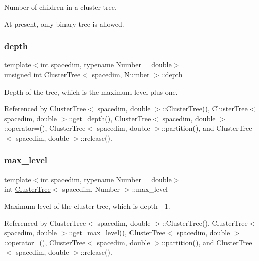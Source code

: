 Number of children in a cluster tree.

At present, only binary tree is allowed. \mbox{\label{classClusterTree_a051df20340ed3f0e4bc0ee1fb1119f9f}} 
\subsubsection{\texorpdfstring{depth}{depth}}
{\footnotesize\ttfamily template$<$int spacedim, typename Number = double$>$ \\
unsigned int \hyperlink{classClusterTree}{Cluster\+Tree}$<$ spacedim, Number $>$\+::depth\hspace{0.3cm}{\ttfamily [private]}}

Depth of the tree, which is the maximum level plus one. 

Referenced by Cluster\+Tree$<$ spacedim, double $>$\+::\+Cluster\+Tree(), Cluster\+Tree$<$ spacedim, double $>$\+::get\+\_\+depth(), Cluster\+Tree$<$ spacedim, double $>$\+::operator=(), Cluster\+Tree$<$ spacedim, double $>$\+::partition(), and Cluster\+Tree$<$ spacedim, double $>$\+::release().

\mbox{\label{classClusterTree_a77800bb9f86c689821ba4d549ce97a58}} 
\subsubsection{\texorpdfstring{max\+\_\+level}{max\_level}}
{\footnotesize\ttfamily template$<$int spacedim, typename Number = double$>$ \\
int \hyperlink{classClusterTree}{Cluster\+Tree}$<$ spacedim, Number $>$\+::max\+\_\+level\hspace{0.3cm}{\ttfamily [private]}}

Maximum level of the cluster tree, which is {\ttfamily depth} -\/ 1. 

Referenced by Cluster\+Tree$<$ spacedim, double $>$\+::\+Cluster\+Tree(), Cluster\+Tree$<$ spacedim, double $>$\+::get\+\_\+max\+\_\+level(), Cluster\+Tree$<$ spacedim, double $>$\+::operator=(), Cluster\+Tree$<$ spacedim, double $>$\+::partition(), and Cluster\+Tree$<$ spacedim, double $>$\+::release().

